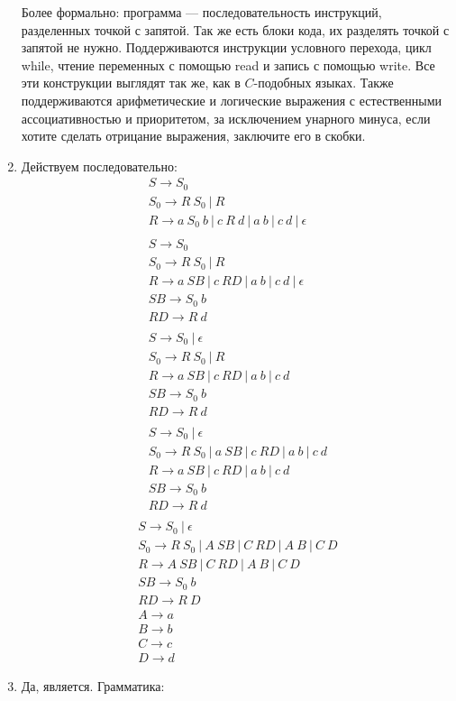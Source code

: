 \documentclass[14pt]{extarticle}
\begin{document}
\begin{enumerate}
          Более формально: программа --- последовательность инструкций, разделенных точкой с
          запятой. Так же есть блоки кода, их разделять точкой с запятой не нужно. Поддерживаются
          инструкции условного перехода, цикл while, чтение переменных с помощью read и запись с помощью
          write. Все эти конструкции выглядят так же, как в $C$-подобных языках. Также поддерживаются
          арифметические и логические выражения с естественными ассоциативностью и приоритетом, за исключением
          унарного минуса, если хотите сделать отрицание выражения, заключите его в скобки.
    \item Действуем последовательно:
          \begin{gather*}
              S \to S_0\\
              S_0 \to R\ S_0\ |\ R\\
              R \to a\ S_0\ b\ |\ c\ R\ d\ |\ a\ b\ |\ c\ d\ |\ \epsilon\\
              \\
              S \to S_0\\
              S_0 \to R\ S_0\ |\ R\\
              R \to a\ SB\ |\ c\ RD\ |\ a\ b\ |\ c\ d\ |\ \epsilon\\
              SB \to S_0\ b\\
              RD \to R\ d\\
              \\
              S \to S_0\ |\ \epsilon \\
              S_0 \to R\ S_0\ |\ R\ \\
              R \to a\ SB\ |\ c\ RD\ |\ a\ b\ |\ c\ d\ \\
              SB \to S_0\ b\\
              RD \to R\ d\\
              \\
              S \to S_0\ |\ \epsilon \\
              S_0 \to R\ S_0\ |\ a\ SB\ |\ c\ RD\ |\ a\ b\ |\ c\ d\\
              R \to a\ SB\ |\ c\ RD\ |\ a\ b\ |\ c\ d\ \\
              SB \to S_0\ b\\
              RD \to R\ d\\
          \end{gather*}
          \begin{gather*}
              S \to S_0\ |\ \epsilon \\
              S_0 \to R\ S_0\ |\ A\ SB\ |\ C\ RD\ |\ A\ B\ |\ C\ D\\
              R \to A\ SB\ |\ C\ RD\ |\ A\ B\ |\ C\ D\ \\
              SB \to S_0\ b\\
              RD \to R\ D\\
              A \to a\\
              B \to b\\
              C \to c\\
              D \to d
          \end{gather*}
    \item Да, является. Грамматика:


\end{enumerate}
\end{document}

